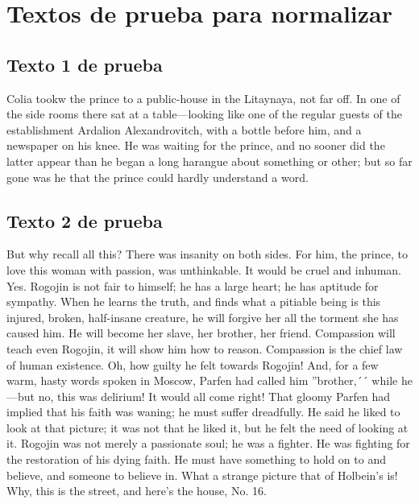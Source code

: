 \documentclass[a4paper,twocolumn]{article}
\begin{document}
    \appendix


    \section{Textos de prueba para normalizar}\label{sec:salida-del-procesamiento-del-programa-c} \label{app:a}


    \subsection{Texto 1 de prueba}\label{subsec:texto1}
    Colia tookw the prince to a public-house in the Litaynaya, not far off.
     In one of the side rooms there sat at a table—looking like one of the
    regular guests of the establishment Ardalion Alexandrovitch, with a
    bottle before him, and a newspaper on his knee. He was waiting for the
    prince, and no sooner did the latter appear than he began a long
    harangue about something or other; but so far gone was he that the
    prince could hardly understand a word.


    \subsection{Texto 2 de prueba}\label{subsec:texto2}
    But why recall all this? There was insanity on both sides. For him, the
    prince, to love this woman with passion, was unthinkable. It would be
    cruel and inhuman. Yes. Rogojin is not fair to himself; he has a large
    heart; he has aptitude for sympathy. When he learns the truth, and
    finds what a pitiable being is this injured, broken, half-insane
    creature, he will forgive her all the torment she has caused him. He
    will become her slave, her brother, her friend. Compassion will teach
    even Rogojin, it will show him how to reason. Compassion is the chief
    law of human existence. Oh, how guilty he felt towards Rogojin! And,
    for a few warm, hasty words spoken in Moscow, Parfen had called him
    ''brother,´´ while he—but no, this was delirium! It would all come right!
    That gloomy Parfen had implied that his faith was waning; he must
    suffer dreadfully. He said he liked to look at that picture; it was not
    that he liked it, but he felt the need of looking at it. Rogojin was
    not merely a passionate soul; he was a fighter. He was fighting for the
    restoration of his dying faith. He must have something to hold on to
    and believe, and someone to believe in. What a strange picture that of
    Holbein’s is! Why, this is the street, and here’s the house, No. 16.
\end{document}
